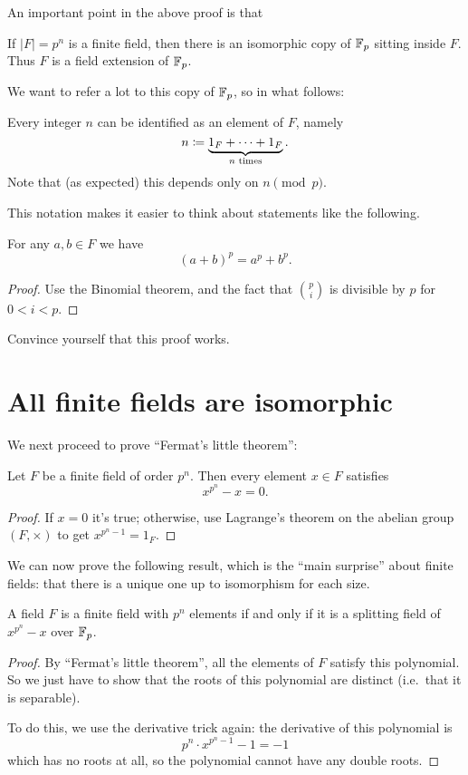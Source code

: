 An important point in the above proof is that
\begin{lemma}
	If $\left\lvert F \right\rvert = p^n$ is a finite field,
	then there is an isomorphic copy of $\mathbb F_p$ sitting inside $F$.
	Thus $F$ is a field extension of $\mathbb F_p$.
\end{lemma}

We want to refer a lot to this copy of $\mathbb F_p$, so in what follows:
\begin{abuse}
	Every integer $n$ can be identified as an element of $F$, namely
	\[ n \coloneqq \underbrace{1_F + \dots + 1_F}_{\text{$n$ times}}. \]
	Note that (as expected) this depends only on $n \pmod p$.
\end{abuse}

This notation makes it easier to think about statements like the following.
\begin{theorem}
	For any $a,b \in F$ we have
	\[ (a+b)^p = a^p + b^p. \]
\end{theorem}
\begin{proof}
	Use the Binomial theorem, and the fact that $\binom pi$ is divisible by $p$ for $0 < i < p$.
\end{proof}
\begin{exercise}
	Convince yourself that this proof works.
\end{exercise}

\section{All finite fields are isomorphic}
We next proceed to prove ``Fermat's little theorem'':
\begin{theorem}
	Let $F$ be a finite field of order $p^n$.
	Then every element $x \in F$ satisfies
	\[ x^{p^n} - x = 0. \]
\end{theorem}
\begin{proof}
	If $x = 0$ it's true; otherwise, use Lagrange's theorem
	on the abelian group $(F, \times)$ to get $x^{p^n-1} = 1_F$.
\end{proof}

We can now prove the following result,
which is the ``main surprise'' about finite fields:
that there is a unique one up to isomorphism for each size.
\begin{theorem}
	A field $F$ is a finite field with $p^n$ elements if and only if
	it is a splitting field of $x^{p^n}-x$ over $\mathbb F_p$.
\end{theorem}
\begin{proof}
	By ``Fermat's little theorem'', all the elements of $F$ satisfy this polynomial.
	So we just have to show that the roots of this polynomial are distinct
	(i.e.\ that it is separable).

	To do this, we use the derivative trick again: the derivative of this polynomial is
	\[ p^n \cdot x^{p^n-1} - 1  = -1 \]
	which has no roots at all, so the polynomial cannot have any double roots. \qedhere
\end{proof}

